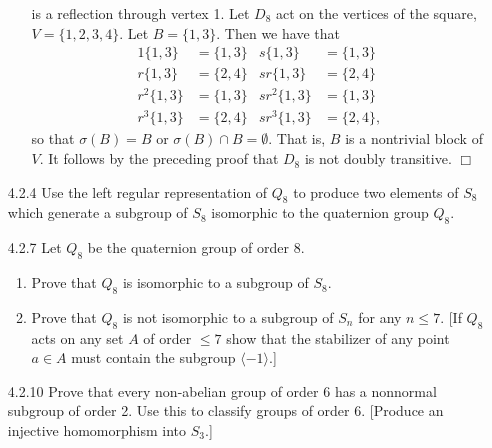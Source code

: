 \documentclass[9pt]{article}
\newcommand{\qed}{\hfill \ensuremath{\Box}}
\newcommand{\cyc}[1]{\langle #1 \rangle}
\begin{document}
\begin{enumerate}
\begin{enumerate}
               is a reflection through vertex 1. Let $D_8$ act on the vertices
               of the square, $V = \{1, 2, 3, 4\}$. Let $B = \{1 , 3\}$. Then we
               have that
               \begin{align*}
                  1\{1, 3\} &= \{1, 3\} & s\{1, 3\} &= \{1, 3\} \\
                  r\{1, 3\} &= \{2, 4\} & sr\{1, 3\} &= \{2, 4\} \\
                  r^2\{1, 3\} &= \{1, 3\} & sr^2\{1, 3\} &= \{1, 3\} \\
                  r^3\{1, 3\} &= \{2, 4\} & sr^3\{1, 3\} &= \{2, 4\},
               \end{align*}
               so that $\sigma(B) = B$ or $\sigma(B) \cap B = \emptyset$. That
               is, $B$ is a nontrivial block of $V$. It follows by the preceding
               proof that $D_8$ is not doubly transitive. \qed
               
      \end{enumerate}
   \item[4.2.4]   Use the left regular representation of $Q_8$ to produce two
                  elements of $S_8$ which generate a subgroup of $S_8$
                  isomorphic to the quaternion group $Q_8$.
   \item[4.2.7]   Let $Q_8$ be the quaternion group of order 8.
                  \begin{enumerate}
                     \item Prove that $Q_8$ is isomorphic to a subgroup of
                           $S_8$.
                     \item Prove that $Q_8$ is not isomorphic to a subgroup of
                           $S_n$ for any $n \le 7$. [If $Q_8$ acts on any set
                           $A$ of order $\le 7$ show that the stabilizer of any
                           point $a \in A$ must contain the subgroup
                           $\cyc{-1}$.]
                  \end{enumerate}
   \item[4.2.10]  Prove that every non-abelian group of order 6 has a nonnormal
                  subgroup of order 2. Use this to classify groups of order 6.
                  [Produce an injective homomorphism into $S_3$.]
\end{enumerate}
\end{document}
